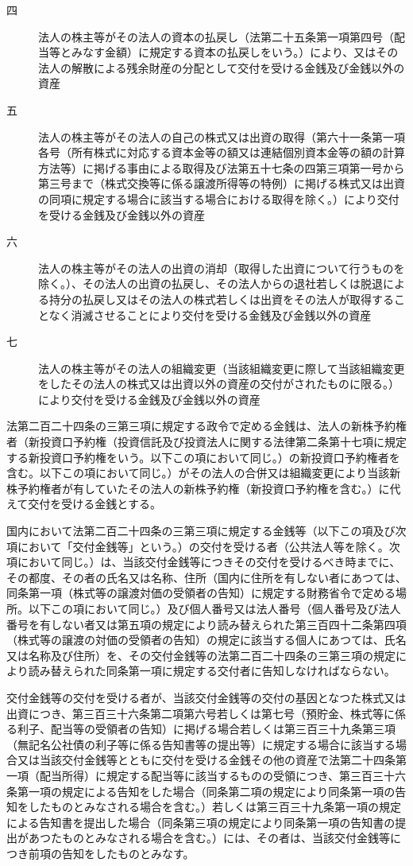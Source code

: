 \documentclass[twocolumn,a4j,10pt]{ltjtarticle}
\begin{document}
\begin{description}
\begin{description}
\item[四]法人の株主等がその法人の資本の払戻し（法第二十五条第一項第四号（配当等とみなす金額）に規定する資本の払戻しをいう。）により、又はその法人の解散による残余財産の分配として交付を受ける金銭及び金銭以外の資産
\item[五]法人の株主等がその法人の自己の株式又は出資の取得（第六十一条第一項各号（所有株式に対応する資本金等の額又は連結個別資本金等の額の計算方法等）に掲げる事由による取得及び法第五十七条の四第三項第一号から第三号まで（株式交換等に係る譲渡所得等の特例）に掲げる株式又は出資の同項に規定する場合に該当する場合における取得を除く。）により交付を受ける金銭及び金銭以外の資産
\item[六]法人の株主等がその法人の出資の消却（取得した出資について行うものを除く。）、その法人の出資の払戻し、その法人からの退社若しくは脱退による持分の払戻し又はその法人の株式若しくは出資をその法人が取得することなく消滅させることにより交付を受ける金銭及び金銭以外の資産
\item[七]法人の株主等がその法人の組織変更（当該組織変更に際して当該組織変更をしたその法人の株式又は出資以外の資産の交付がされたものに限る。）により交付を受ける金銭及び金銭以外の資産
\end{description}
\item[\rensuji{2}]法第二百二十四条の三第三項に規定する政令で定める金銭は、法人の新株予約権者（新投資口予約権（投資信託及び投資法人に関する法律第二条第十七項に規定する新投資口予約権をいう。以下この項において同じ。）の新投資口予約権者を含む。以下この項において同じ。）がその法人の合併又は組織変更により当該新株予約権者が有していたその法人の新株予約権（新投資口予約権を含む。）に代えて交付を受ける金銭とする。
\item[\rensuji{3}]国内において法第二百二十四条の三第三項に規定する金銭等（以下この項及び次項において「交付金銭等」という。）の交付を受ける者（公共法人等を除く。次項において同じ。）は、当該交付金銭等につきその交付を受けるべき時までに、その都度、その者の氏名又は名称、住所（国内に住所を有しない者にあつては、同条第一項（株式等の譲渡対価の受領者の告知）に規定する財務省令で定める場所。以下この項において同じ。）及び個人番号又は法人番号（個人番号及び法人番号を有しない者又は第五項の規定により読み替えられた第三百四十二条第四項（株式等の譲渡の対価の受領者の告知）の規定に該当する個人にあつては、氏名又は名称及び住所）を、その交付金銭等の法第二百二十四条の三第三項の規定により読み替えられた同条第一項に規定する交付者に告知しなければならない。
\item[\rensuji{4}]交付金銭等の交付を受ける者が、当該交付金銭等の交付の基因となつた株式又は出資につき、第三百三十六条第二項第六号若しくは第七号（預貯金、株式等に係る利子、配当等の受領者の告知）に掲げる場合若しくは第三百三十九条第三項（無記名公社債の利子等に係る告知書等の提出等）に規定する場合に該当する場合又は当該交付金銭等とともに交付を受ける金銭その他の資産で法第二十四条第一項（配当所得）に規定する配当等に該当するものの受領につき、第三百三十六条第一項の規定による告知をした場合（同条第二項の規定により同条第一項の告知をしたものとみなされる場合を含む。）若しくは第三百三十九条第一項の規定による告知書を提出した場合（同条第三項の規定により同条第一項の告知書の提出があつたものとみなされる場合を含む。）には、その者は、当該交付金銭等につき前項の告知をしたものとみなす。

\end{description}
\end{document}
